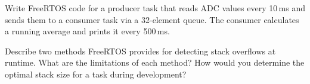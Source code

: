 \begin{exercise}
Write FreeRTOS code for a producer task that reads ADC values every 10\,ms and sends them to a consumer task via a 32-element queue. The consumer calculates a running average and prints it every 500\,ms.
\end{exercise}

\begin{exercise}
Describe two methods FreeRTOS provides for detecting stack overflows at runtime. What are the limitations of each method? How would you determine the optimal stack size for a task during development?
\end{exercise}
